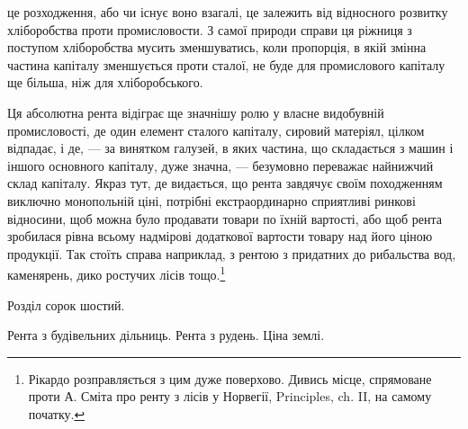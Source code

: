 це розходження, або чи існує воно взагалі, це залежить від відносного розвитку хліборобства
проти промисловости. З самої природи справи ця ріжниця з поступом
хліборобства мусить зменшуватись, коли пропорція, в якій змінна частина
капіталу зменшується проти сталої, не буде для промислового капіталу ще
більша, ніж для хліборобського.

Ця абсолютна рента відіграє ще значнішу ролю у власне видобувній
промисловості, де один елемент сталого капіталу, сировий матеріял, цілком відпадає,
і де, — за винятком галузей, в яких частина, що складається з машин і
іншого основного капіталу, дуже значна, — безумовно переважає найнижчий
склад капіталу. Якраз тут, де видається, що рента завдячує своїм походженням
виключно монопольній ціні, потрібні екстраординарно сприятливі ринкові відносини,
щоб можна було продавати товари по їхній вартості, або щоб рента
зробилася рівна всьому надмірові додаткової вартости товару над його ціною
продукції. Так стоїть справа наприклад, з рентою з придатних до рибальства
вод, каменярень, дико ростучих лісів тощо.\footnote{
Рікардо розправляється з цим дуже поверхово. Дивись місце, спрямоване проти А. Сміта
про ренту з лісів у Норвегії, Principles, ch. II, на самому початку.
}

Розділ сорок шостий.

Рента з будівельних дільниць. Рента з рудень. Ціна землі.

